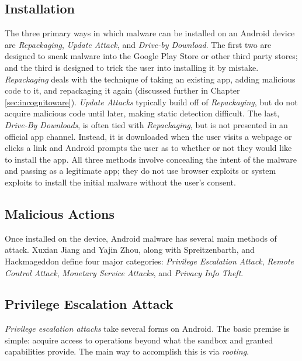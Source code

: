 \documentclass{acm_proc_article-sp}
\begin{document}
\subsection{Installation}
The three primary ways in which malware can be installed on an Android device are \textit{Repackaging}, \textit{Update Attack}, and \textit{Drive-by Download}\citep{zhou2012dissecting}. The first two are designed to sneak malware into the Google Play Store or other third party stores; and the third is designed to trick the user into installing it by mistake. \textit{Repackaging} deals with the technique of taking an existing app, adding malicious code to it, and repackaging it again (discussed further in Chapter \ref{sec:incognitoware}). \textit{Update Attacks} typically build off of \textit{Repackaging}, but do not acquire malicious code until later, making static detection difficult\citep{zhou2012dissecting}. The last, \textit{Drive-By Downloads}, is often tied with \textit{Repackaging}, but is not presented in an official app channel. Instead, it is downloaded when the user visits a webpage or clicks a link\citep{zhou2012dissecting} and Android prompts the user as to whether or not they would like to install the app. All three methods involve concealing the intent of the malware and passing as a legitimate app; they do not use browser exploits or system exploits to install the initial malware without the user's consent.

\subsection{Malicious Actions}
Once installed on the device, Android malware has several main methods of attack. Xuxian Jiang
 and Yajin Zhou\citep{zhou2012dissecting}, along with Spreitzenbarth\citep{spreitzenbarth2013}, and Hackmageddon\citep{hackmageddon2011} define four major categories: \textit{Privilege Escalation Attack}, \textit{Remote Control Attack}, \textit{Monetary Service Attacks}, and \textit{Privacy Info Theft}. 


\subsection{Privilege Escalation Attack}
\textit{Privilege escalation attacks} take several forms on Android. The basic premise is simple: acquire access to operations beyond what the sandbox and granted capabilities provide. The main way to accomplish this is via \textit{rooting}.
\end{document}
